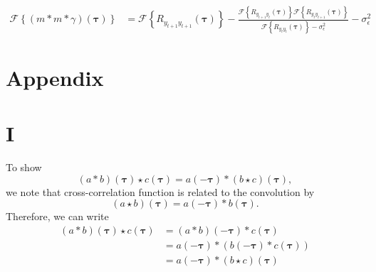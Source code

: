 \documentclass[]{article}
\begin{document}
\begin{align}
 \mathcal F\left\lbrace (m\ast m \ast \gamma)(\boldsymbol\tau)\right\rbrace&= \mathcal F\left\lbrace R_{y_{t+1}y_{t+1}}(\boldsymbol{\tau})\right\rbrace-\frac{\mathcal F\left\lbrace R_{y_{t+1}y_t}(\boldsymbol{\tau})\right\rbrace \mathcal F \left\lbrace R_{y_{t}y_{t+1}}(\boldsymbol{\tau})\right\rbrace}{\mathcal F \left\lbrace R_{y_ty_t}(\boldsymbol{\tau})\right\rbrace-\sigma_{\epsilon}^2}-\sigma_{\epsilon}^2
\end{align}

\section*{Appendix}
\appendix
\section*{I}
To show 
\begin{equation}
 \left(a \ast b \right)\left(\boldsymbol\tau\right)  \star c\left(\boldsymbol\tau\right)  = a\left(-\boldsymbol\tau\right)\ast\left(b \star c\right)\left(\boldsymbol\tau\right),
\end{equation}
we note that cross-correlation function is related to the convolution by \cite{Yarlagadda2009}
\begin{equation}
 \left(a \star b\right)\left(\boldsymbol\tau\right)= a\left(-\boldsymbol\tau \right)\ast b\left(\boldsymbol\tau\right).
\end{equation}
Therefore, we can write
\begin{align}
 \left(a \ast b\right)\left(\boldsymbol\tau\right) \star c\left(\boldsymbol\tau\right)&= \left(a \ast b\right)\left(-\boldsymbol\tau \right)\ast c\left(\boldsymbol\tau\right) \nonumber \\
&=a\left(-\boldsymbol\tau\right)\ast \left(b\left(-\boldsymbol\tau\right) \ast c\left(\boldsymbol\tau\right)\right)\nonumber \\
&=a\left(-\boldsymbol\tau\right)\ast\left(b\star c\right)\left(\boldsymbol\tau\right)
\end{align}
\end{document}
